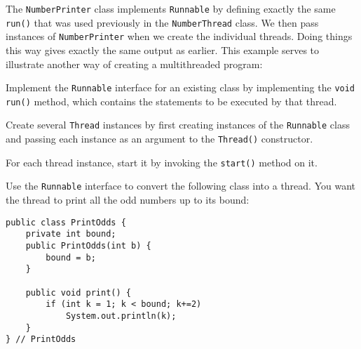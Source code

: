 \noindent The {\tt NumberPrinter} class implements
{\tt Runnable} by defining exactly the same {\tt run()} that was used
previously in the {\tt NumberThread} class.  We then pass instances of
{\tt NumberPrinter} when we create the individual threads.  Doing
things this way gives exactly the same output as earlier.  This example
serves to illustrate another way of creating a multithreaded program:

\begin{BL}
\item Implement the {\tt Runnable} interface for an existing class
 by implementing the {\tt void run()} method, which contains the
 statements to be executed by that thread.

\item Create several {\tt Thread} instances by first creating
 instances of the {\tt Runnable} class and passing each instance as
 an argument to the {\tt Thread()} constructor.

\item For each thread instance, start it by invoking the {\tt start()} 
 method on it.
\end{BL}



\pagebreak
{}


\label{self-study-exercise}
\begin{SSTUDY}
\item  Use the {\tt Runnable} interface to convert the
following class into a thread.  You want the
thread to print all the odd numbers up to its bound:

\begin{jjjlisting}
\begin{lstlisting}
public class PrintOdds {
    private int bound;
    public PrintOdds(int b) {
        bound = b;
    }

    public void print() {
        if (int k = 1; k < bound; k+=2)
            System.out.println(k);
    }
} // PrintOdds
\end{lstlisting}
\end{jjjlisting}
\end{SSTUDY}

